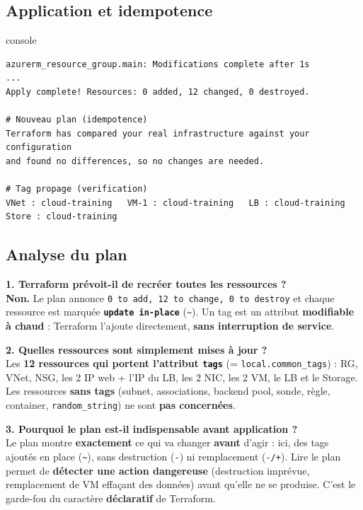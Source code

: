 \documentclass[11pt,a4paper]{article}
\newcommand{\code}[1]{\texttt{#1}}
\begin{document}
\subsection{Application et idempotence}
\begin{codebox}{console}
\begin{Verbatim}
azurerm_resource_group.main: Modifications complete after 1s
...
Apply complete! Resources: 0 added, 12 changed, 0 destroyed.

# Nouveau plan (idempotence)
Terraform has compared your real infrastructure against your configuration
and found no differences, so no changes are needed.

# Tag propage (verification)
VNet : cloud-training   VM-1 : cloud-training   LB : cloud-training   Store : cloud-training
\end{Verbatim}
\end{codebox}

\subsection{Analyse du plan}
\textbf{1. Terraform prévoit-il de recréer toutes les ressources ?}\\
\textbf{Non.} Le plan annonce \code{0 to add, 12 to change, 0 to destroy} et chaque ressource est marquée
\textbf{\code{update in-place}} (\code{\textasciitilde}). Un tag est un attribut \textbf{modifiable à chaud} :
Terraform l'ajoute directement, \textbf{sans interruption de service}.

\textbf{2. Quelles ressources sont simplement mises à jour ?}\\
Les \textbf{12 ressources qui portent l'attribut \code{tags}} (= \code{local.common\_tags}) : RG, VNet, NSG,
les 2 IP web + l'IP du LB, les 2 NIC, les 2 VM, le LB et le Storage. Les ressources \textbf{sans tags} (subnet,
associations, backend pool, sonde, règle, container, \code{random\_string}) ne sont \textbf{pas concernées}.

\textbf{3. Pourquoi le plan est-il indispensable avant application ?}\\
Le plan montre \textbf{exactement} ce qui va changer \textbf{avant} d'agir : ici, des tags ajoutés en place
(\code{\textasciitilde}), sans destruction (\code{-}) ni remplacement (\code{-/+}). Lire le plan permet de
\textbf{détecter une action dangereuse} (destruction imprévue, remplacement de VM effaçant des données) avant
qu'elle ne se produise. C'est le garde-fou du caractère \textbf{déclaratif} de Terraform.
\end{document}
